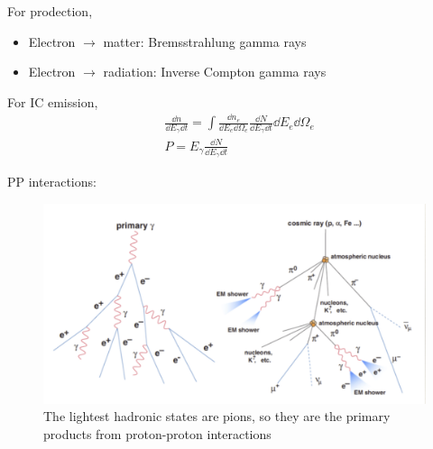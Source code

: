 \documentclass{sciposter}
\begin{document}
\begin{multicols}{3}
For prodection,
\begin{itemize}
    \item Electron $\rightarrow$ matter: Bremsstrahlung gamma rays
    \item Electron $\rightarrow$ radiation: Inverse Compton gamma rays
\end{itemize}

For IC emission,
\begin{align}
    &\frac{\dd{n}}{\dd{E_{\gamma} }\dd{t}}=\int \frac{\dd{n_{e} }}{\dd{E_{e} \dd{\Omega_{e} }}
    }\frac{\dd{N}}{\dd{E_{\gamma} }\dd{t}}\dd{E_{e} }\dd{\Omega_{e} }\\
    &P=E_{\gamma}\frac{\dd{N}}{\dd{E_{\gamma} }\dd{t}} 
\end{align}

PP interactions:

\begin{figure}
    \centering 
    \includegraphics[width=1\textwidth]{1.png}
    \caption{The lightest hadronic states are pions, so they are the primary products from proton-proton interactions}
\end{figure}


\end{multicols}
\end{document}
